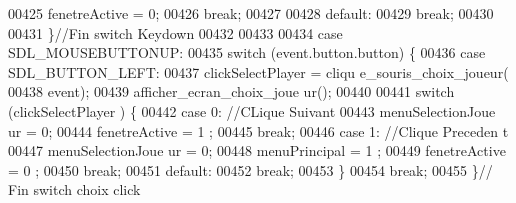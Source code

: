 \begin{DoxyCode}
00425                                                         fenetreActive = 0;
00426                                                         \textcolor{keywordflow}{break};
00427 
00428                                                 \textcolor{keywordflow}{default}:
00429                                                         \textcolor{keywordflow}{break};
00430 
00431                                                 \}\textcolor{comment}{//Fin switch Keydown}
00432 
00433 
00434                                         \textcolor{keywordflow}{case} SDL\_MOUSEBUTTONUP:
00435                                                 \textcolor{keywordflow}{switch} (event.button.button) \{
00436                                                 \textcolor{keywordflow}{case} SDL\_BUTTON\_LEFT:
00437                                                         clickSelectPlayer = cliqu
      e\_souris\_choix\_joueur(
00438                                                                         event);
00439                                                         afficher\_ecran\_choix\_joue
      ur();
00440 
00441                                                         \textcolor{keywordflow}{switch} (clickSelectPlayer
      ) \{
00442                                                         \textcolor{keywordflow}{case} 0: \textcolor{comment}{//CLique Suivant}
00443                                                                 menuSelectionJoue
      ur = 0;
00444                                                                 fenetreActive = 1
      ;
00445                                                                 \textcolor{keywordflow}{break};
00446                                                         \textcolor{keywordflow}{case} 1: \textcolor{comment}{//Clique Preceden
      t}
00447                                                                 menuSelectionJoue
      ur = 0;
00448                                                                 menuPrincipal = 1
      ;
00449                                                                 fenetreActive = 0
      ;
00450                                                                 \textcolor{keywordflow}{break};
00451                                                         \textcolor{keywordflow}{default}:
00452                                                                 \textcolor{keywordflow}{break};
00453                                                         \}
00454                                                         \textcolor{keywordflow}{break};
00455                                                 \}\textcolor{comment}{// Fin switch choix click}

\end{DoxyCode}
